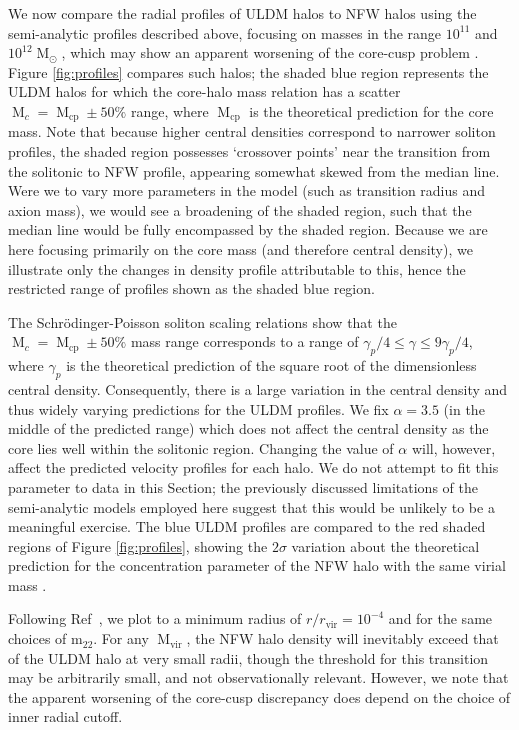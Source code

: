 \documentclass{pasa}%
\begin{document}
We now compare the radial profiles of ULDM halos to NFW halos using the semi-analytic profiles described above, focusing on masses in the range $10^{11}$ and $10^{12} \operatorname{M}_{\odot}$, which may show an apparent worsening of the core-cusp problem \cite{Robles:2018fur}. Figure \ref{fig:profiles} compares such halos; the shaded blue region represents the ULDM halos for which the core-halo mass relation has a scatter $\operatorname{M}_c = \operatorname{M}_{\mathrm{cp}} \pm 50 \% $ range, where $\operatorname{M}_{\mathrm{cp}}$ is the theoretical prediction for the core mass. Note that because higher central densities correspond to narrower soliton profiles, the shaded region possesses `crossover points' near the transition from the solitonic to NFW profile, appearing somewhat skewed from the median line. Were we to vary more parameters in the model (such as transition radius and axion mass), we would see a broadening of the shaded region, such that the median line would be fully encompassed by the shaded region. Because we are here focusing primarily on the core mass (and therefore central density), we illustrate only the changes in density profile attributable to this, hence the restricted range of profiles shown as the shaded blue region.

The  Schr{\"o}dinger-Poisson soliton scaling relations show that the $\operatorname{M}_c = \operatorname{M}_{\mathrm{cp}} \pm 50 \% $ mass range corresponds to a range of $ \gamma_p /4 \leq \gamma \leq 9\gamma_p/4$, where $\gamma_p$ is the theoretical prediction of the square root of the dimensionless central density. Consequently, there is a large variation in the central density and thus widely varying predictions for the ULDM profiles. We fix $\alpha = 3.5$ (in the middle of the predicted range) which does not affect the central density as the core lies well within the solitonic region. Changing the value of $\alpha$ will, however, affect the predicted velocity profiles for each halo. We do not attempt to fit this parameter to data in this Section; the previously discussed limitations of the semi-analytic models employed here suggest that this would be unlikely to be a meaningful exercise. The blue ULDM profiles are compared to the red shaded regions of Figure \ref{fig:profiles}, showing the $2\sigma$ variation about the theoretical prediction for the concentration parameter of the NFW halo with the same virial mass \cite{Maccio:2008pcd}. 


Following Ref~\cite{Robles:2018fur}, we plot to a minimum radius of $r/r_{\mathrm{vir}} = 10^{-4}$ and for the same choices of $\mathrm{m_{22}}$. For any $\operatorname{M}_{\mathrm{vir}}$, the NFW halo density  will inevitably exceed that of the ULDM halo at very small radii, though the threshold for this transition may be arbitrarily small, and not observationally relevant. However, we note that the apparent worsening of the core-cusp discrepancy does depend on the choice of inner radial cutoff.
\end{document}
